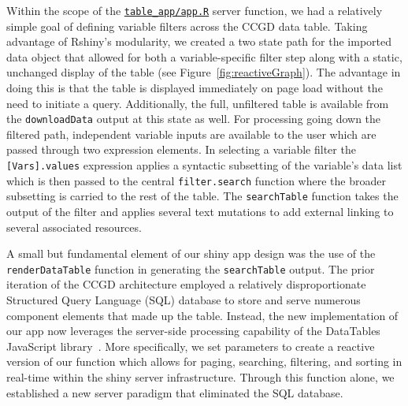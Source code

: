 \documentclass[10pt]{report}
\begin{document}
Within the scope of the \href{https://github.com/ctastad/ccgd/blob/master/table_app/app.R}{\texttt{table\_app/app.R}} server function, we had a relatively simple goal of defining variable filters across the CCGD data table. Taking advantage of Rshiny's modularity, we created a two state path for the imported data object that allowed for both a variable-specific filter step along with a static, unchanged display of the table (see Figure~\ref{fig:reactiveGraph}). The advantage in doing this is that the table is displayed immediately on page load without the need to initiate a query. Additionally, the full, unfiltered table is available from the \texttt{downloadData} output at this state as well. For processing going down the filtered path, independent variable inputs are available to the user which are passed through two expression elements. In selecting a variable filter the \texttt{[Vars].values} expression applies a syntactic subsetting of the variable's data list which is then passed to the central \texttt{filter.search} function where the broader subsetting is carried to the rest of the table. The \texttt{searchTable} function takes the output of the filter and applies several text mutations to add external linking to several associated resources.

A small but fundamental element of our shiny app design was the use of the \texttt{renderDataTable} function in generating the \texttt{searchTable} output. The prior iteration of the CCGD architecture employed a relatively disproportionate Structured Query Language (SQL) database to store and serve numerous component elements that made up the table. Instead, the new implementation of our app now leverages the server-side processing capability of the DataTables JavaScript library~\cite{DataTablesTablePlugin}. More specifically, we set parameters to create a reactive version of our function which allows for paging, searching, filtering, and sorting in real-time within the shiny server infrastructure. Through this function alone, we established a new server paradigm that eliminated the SQL database.
\end{document}
